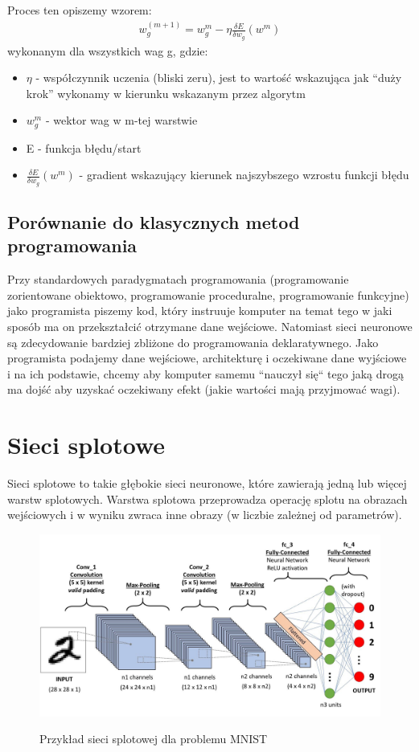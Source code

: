 \documentclass{article}
\begin{document}
Proces ten opiszemy wzorem:
\begin{align*}
    w_g^{(m+1)}=w_g^m - \eta\frac{\delta E}{\delta w_g}(w^m)
\end{align*}
wykonanym dla wszystkich wag g, gdzie:
\begin{itemize}
    \item $\eta$ - współczynnik uczenia (bliski zeru), jest to wartość wskazująca jak ``duży krok'' wykonamy w kierunku wskazanym przez algorytm
    \item $w_g^m$ - wektor wag w m-tej warstwie
    \item E - funkcja błędu/start
    \item $\frac{\delta E}{\delta w_g}(w^m)$ - gradient wskazujący kierunek najszybszego wzrostu funkcji błędu
\end{itemize}

\subsection{Porównanie do klasycznych metod programowania}
Przy standardowych paradygmatach programowania (programowanie zorientowane obiektowo, programowanie proceduralne, programowanie funkcyjne) jako programista piszemy kod, który
instruuje komputer na temat tego w jaki sposób ma on przekształcić otrzymane dane wejściowe.
Natomiast sieci neuronowe są zdecydowanie bardziej zbliżone do programowania deklaratywnego. Jako programista podajemy dane wejściowe, architekturę i oczekiwane dane wyjściowe i na ich podstawie, chcemy aby komputer samemu ``nauczył się`` tego jaką drogą ma dojść aby uzyskać oczekiwany efekt (jakie wartości mają przyjmować wagi).
\newpage
\section{Sieci splotowe}
Sieci splotowe to takie głębokie sieci neuronowe, które zawierają jedną lub więcej warstw splotowych.
Warstwa splotowa przeprowadza operację splotu na obrazach wejściowych i w wyniku zwraca inne obrazy (w liczbie zależnej od parametrów).
\begin{figure}[H]
    \centering
    \includegraphics[width=\linewidth]{images/cnn.jpeg}
    \caption{Przykład sieci splotowej dla problemu MNIST}
    \cite{cnn}
\end{figure}
\end{document}
